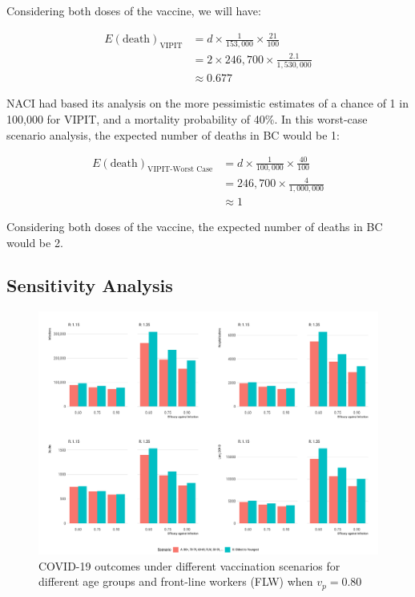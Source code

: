 \documentclass[]{elsarticle} %
\begin{document}
Considering both doses of the vaccine, we will have:

\[
\begin{aligned}
E(\text{death})_{\text{VIPIT}} & = d \times \frac{1}{153,000} \times \frac{21}{100} \\
& = 2 \times 246,700 \times \frac{2.1}{1,530,000} \\
& \approx 0.677
\end{aligned}
\]

NACI had based its analysis on the more pessimistic estimates of a
chance of 1 in 100,000 for VIPIT, and a mortality probability of 40\%.
In this worst-case scenario analysis, the expected number of deaths in
BC would be 1:

\[
\begin{aligned}
E(\text{death})_{\text{VIPIT-Worst Case}} & = d \times \frac{1}{100,000} \times \frac{40}{100} \\
& = 246,700 \times \frac{4}{1,000,000} \\
& \approx 1
\end{aligned}
\]

Considering both doses of the vaccine, the expected number of deaths in
BC would be 2.

\hypertarget{sensitivity-analysis}{%
\subsection{Sensitivity Analysis}\label{sensitivity-analysis}}

\begin{figure}[htb]
\begin{center}
\includegraphics[width=6in]{"../figures/fig-barplots.pdf"}
\caption{COVID-19 outcomes under different vaccination scenarios for different age groups and front-line workers (FLW) when $v_p=0.80$}
\end{center}
\end{figure}
\end{document}
